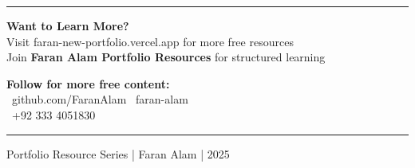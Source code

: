 \documentclass[12pt,a4paper]{article}
\begin{document}
\newpage
\pagecolor{FaranDark}
\color{white}
\centering
\vspace*{4cm}

{\color{FaranBlue}\rule{\textwidth}{3pt}}
\vspace{1cm}

{\fontsize{28}{36}\selectfont\textbf{Want to Learn More?}}\\[0.5cm]
{\large Visit \textcolor{FaranBlue}{faran-new-portfolio.vercel.app} for more free resources}\\[0.3cm]
{\large Join \textbf{Faran Alam Portfolio Resources} for structured learning}

\vspace{2cm}

\begin{tcolorbox}[
    colback=FaranBlue,
    colframe=FaranBlue,
    width=0.7\textwidth,
    arc=10pt,
    boxrule=0pt,
    halign=center
]
\centering\color{white}
{\large\textbf{Follow for more free content:}}\\[0.4cm]
\faGithub~github.com/FaranAlam \quad\quad
\faLinkedin~faran-alam \\[0.3cm]
\faWhatsapp~+92 333 4051830
\end{tcolorbox}

\vspace{2cm}
{\color{FaranBlue}\rule{\textwidth}{3pt}}
{\small\color{FaranGray}Portfolio Resource Series | Faran Alam | 2025}
\end{document}
